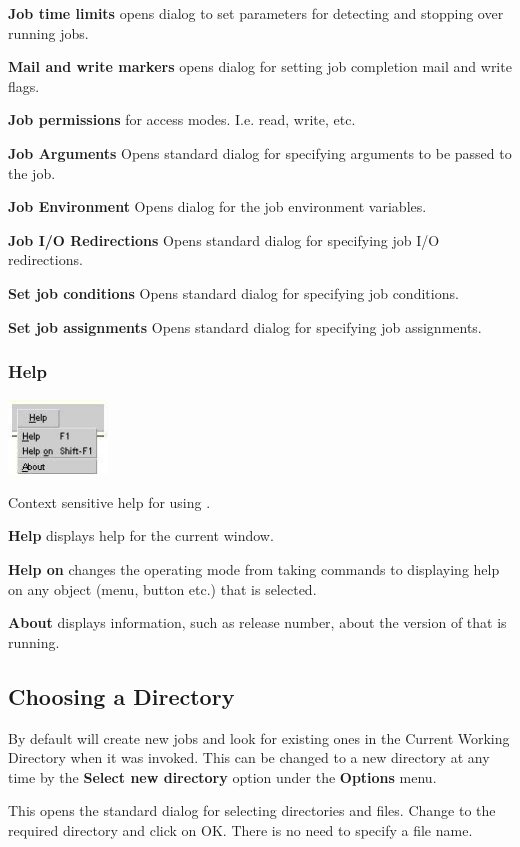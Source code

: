 \textbf{Job time limits} opens dialog to set parameters for detecting and stopping over running jobs.

\textbf{Mail and write markers} opens dialog for setting job completion mail and write flags.

\textbf{Job permissions} for access modes. I.e. read, write, etc.

\textbf{Job Arguments} Opens standard dialog for specifying arguments to be passed to the job.

\textbf{Job Environment} Opens dialog for the job environment variables.

\textbf{Job I/O Redirections} Opens standard dialog for specifying job I/O redirections.

\textbf{Set job conditions} Opens standard dialog for specifying job conditions.

\textbf{Set job assignments} Opens standard dialog for specifying job assignments.

\subsubsection{Help}
 \includegraphics[width=2.641cm,height=1.983cm]{img/ref44.jpg} 

Context sensitive help for using \PrXmbtr{}.

\textbf{Help} displays help for the current window.

\textbf{Help on} changes the operating mode from taking commands to displaying help on any object (menu, button etc.) that is selected.

\textbf{About} displays information, such as release number, about the version of \XmbtrName{} that is running.

\subsection{Choosing a Directory}
By default \PrXmbtr{} will create new jobs and look for existing ones in the Current Working Directory when it was invoked.
This can be changed to a new directory at any time by the \textbf{Select new directory} option under the \textbf{Options} menu.

This opens the standard dialog for selecting directories and files. Change to the required directory and click on OK. There is no need to
specify a file name.

